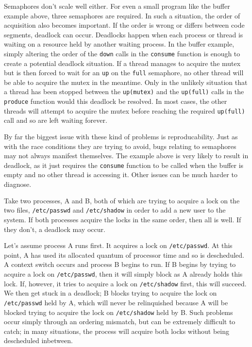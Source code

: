 Semaphores don't scale well either.  For even a small program like the
buffer example above, three semaphores are required.  In such a
situation, the order of acquisition also becomes important.  If the
order is wrong or differs between code segments, deadlock can occur.
Deadlocks happen when each process or thread is waiting on a resource
held by another waiting process.  In the buffer example, simply
altering the order of the \texttt{down} calls in the \texttt{consume}
function is enough to create a potential deadlock situation.  If a
thread manages to acquire the mutex but is then forced to wait for an
\texttt{up} on the \texttt{full} semaphore, no other thread will be able to
acquire the mutex in the meantime.  Only in the unlikely situation
that a thread has been stopped between the \texttt{up(mutex)} and the
\texttt{up(full)} calls in the \texttt{produce} function would this
deadlock be resolved.  In most cases, the other threads will attempt
to acquire the mutex before reaching the required \texttt{up(full)}
call and so are left waiting forever.

By far the biggest issue with these kind of problems is
reproducability.  Just as with the race conditions they are trying to
avoid, bugs relating to semaphores may not always manifest themselves.
The example above is very likely to result in deadlock, as it just
requires the \texttt{consume} function to be called when the buffer is
empty and no other thread is accessing it.  Other issues can be much
harder to diagnose.

Take two processes, A and B, both of which are trying to acquire a
lock on the two files, \texttt{/etc/passwd} and \texttt{/etc/shadow}
in order to add a new user to the system.  If both processes acquire
the locks in the same order, then all is well.  If they don't, a
deadlock may occur.

Let's assume process A runs first.  It acquires a lock on
\texttt{/etc/passwd}.  At this point, A has used its allocated quantum
of processor time and so is descheduled.  A context switch occurs and
process B begins to run.  If B begins by trying to acquire a lock on
\texttt{/etc/passwd}, then it will simply block as A already holds
this lock.  If, however, it tries to acquire a lock on
\texttt{/etc/shadow} first, this will succeed.  We then get stuck in a
deadlock; B blocks trying to acquire the lock on \texttt{/etc/passwd}
held by A, which will never be relinquished because A will be blocked
trying to acquire the lock on \texttt{/etc/shadow} held by B.  Such
problems occur simply through an ordering mismatch, but can be
extremely difficult to catch; in many situations, the process will
acquire both locks without being descheduled inbetween.

